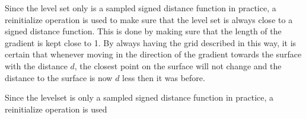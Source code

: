 Since the level set only is a sampled signed distance function in practice, a reinitialize operation is used to make sure that the level set is always close to a signed distance function. 
This is done by making sure that the length of the gradient is kept close to 1.
By always having the grid described in this way, it is certain that whenever moving in the direction of the gradient towards the surface with the distance $d$, the closest point on the surface will not change and the distance to the surface is now $d$ less then it was before.

Since the levelset is only a sampled signed distance function in practice, a reinitialize operation is used